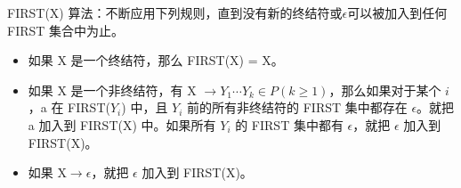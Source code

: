 FIRST(X) 算法：不断应用下列规则，直到没有新的终结符或$\epsilon$可以被加入到任何 FIRST 集合中为止。
\begin{itemize}
    \item 如果 X 是一个终结符，那么 FIRST(X) = X。
    \item 如果 X 是一个非终结符，有 X $\rightarrow Y_1 \cdots Y_k \in P (k\geq 1) $，那么如果对于某个 $i$，a 在 FIRST($Y_i$) 中，且 $Y_i$ 前的所有非终结符的 FIRST 集中都存在 $\epsilon$。就把 a 加入到 FIRST(X) 中。如果所有 $Y_i$ 的 FIRST 集中都有 $\epsilon$，就把 $\epsilon$ 加入到 FIRST(X)。
    \item 如果 X$\rightarrow \epsilon$，就把 $\epsilon$ 加入到 FIRST(X)。
\end{itemize}

\newpage